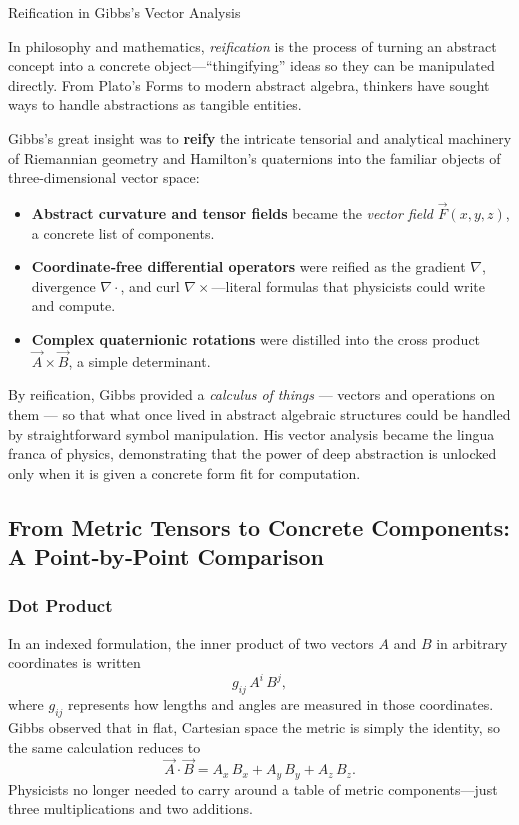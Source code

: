 \medskip

\begin{HistoricalSidebar}{Reification in Gibbs’s Vector Analysis}

    In philosophy and mathematics, \emph{reification} is the process of turning an abstract concept into a concrete object—“thingifying” ideas so they can be manipulated directly.  From Plato’s Forms to modern abstract algebra, thinkers have sought ways to handle abstractions as tangible entities.

    \medskip
    
    Gibbs’s great insight was to \textbf{reify} the intricate tensorial and analytical machinery of Riemannian geometry and Hamilton’s quaternions into the familiar objects of three-dimensional vector space:

    \medskip
    
    \begin{itemize}
      \item \textbf{Abstract curvature and tensor fields} became the \emph{vector field} \(\vec F(x,y,z)\), a concrete list of components.
      \item \textbf{Coordinate‐free differential operators} were reified as the gradient \(\nabla\), divergence \(\nabla\!\cdot\), and curl \(\nabla\times\)—literal formulas that physicists could write and compute.
      \item \textbf{Complex quaternionic rotations} were distilled into the cross product \(\vec A\times\vec B\), a simple determinant.
    \end{itemize}

    \medskip
    
    By reification, Gibbs provided a \emph{calculus of things} --- vectors and operations on them --- so that what once lived in abstract algebraic structures could be handled by straightforward symbol manipulation.  His vector analysis became the lingua franca of physics, demonstrating that the power of deep abstraction is unlocked only when it is given a concrete form fit for computation.

\end{HistoricalSidebar}


\subsection{From Metric Tensors to Concrete Components: A Point‐by‐Point Comparison}

\subsubsection{Dot Product}
In an indexed formulation, the inner product of two vectors \(A\) and \(B\) in arbitrary coordinates is written
\[
g_{ij}\,A^i\,B^j,
\]
where \(g_{ij}\) represents how lengths and angles are measured in those coordinates.  Gibbs observed that in flat, Cartesian space the metric is simply the identity, so the same calculation reduces to
\[
\vec A\cdot\vec B
= A_x\,B_x + A_y\,B_y + A_z\,B_z.
\]
Physicists no longer needed to carry around a table of metric components—just three multiplications and two additions.


